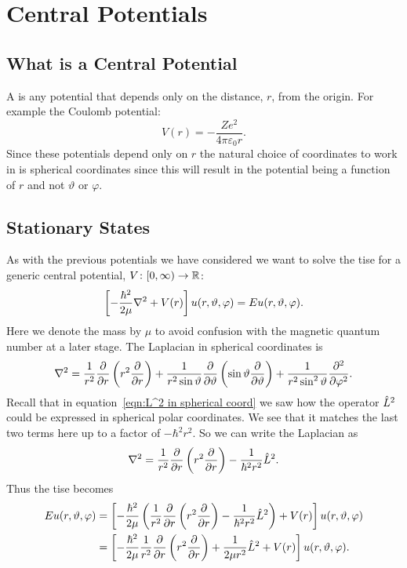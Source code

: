 \documentclass[a4paper]{article}
\theoremstyle{definition}
\begin{document}
    \section{Central Potentials}
    \subsection{What is a Central Potential}
    A  is any potential that depends only on the distance, \(r\), from the origin.
    For example the Coulomb potential:
    \[V(r) = -\frac{Ze^2}{4\pi\varepsilon_0 r}.\]
    Since these potentials depend only on \(r\) the natural choice of coordinates to work in is spherical coordinates since this will result in the potential being a function of \(r\) and not \(\vartheta\) or \(\varphi\).
    
    \subsection{Stationary States}\label{sec:stationary states central potentials}
    As with the previous potentials we have considered we want to solve the \gls{tise} for a generic central potential, \(V\colon[0, \infty)\to\mathbb{R}\):
    \[\left[-\frac{\hbar^2}{2\mu}\nabla^2 + V(r)\right]u(r, \vartheta, \varphi) = Eu(r, \vartheta, \varphi).\]
    Here we denote the mass by \(\mu\) to avoid confusion with the magnetic quantum number at a later stage.
    The Laplacian in spherical coordinates is
    \[\nabla^2 = \frac{1}{r^2}\pdv{r}\left(r^2\pdv{r}\right) + \frac{1}{r^2\sin\vartheta}\pdv{\vartheta}\left(\sin\vartheta\pdv{\vartheta}\right) + \frac{1}{r^2\sin^2\vartheta}\pdv[2]{\varphi}.\]
    Recall that in equation~\ref{eqn:L^2 in spherical coord} we saw how the operator \(\hat{L}^2\) could be expressed in spherical polar coordinates. 
    We see that it matches the last two terms here up to a factor of \(-\hbar^2r^2\).
    So we can write the Laplacian as
    \[\nabla^2 = \frac{1}{r^2}\pdv{r}\left(r^2\pdv{r}\right) - \frac{1}{\hbar^2 r^2}\hat{L}^2.\]
    Thus the \gls{tise} becomes
        \begin{align*}
            Eu(r, \vartheta, \varphi) &= \left[-\frac{\hbar^2}{2\mu} \left(\frac{1}{r^2}\pdv{r} \left(r^2\pdv{r}\right) - \frac{1}{\hbar^2r^2} \hat{L}^2\right) + V(r)\right]u(r, \vartheta, \varphi)\\
            &= \left[-\frac{\hbar^2}{2\mu}\frac{1}{r^2} \pdv{r}\left(r^2\pdv{r}\right) + \frac{1}{2\mu r^2}\hat{L}^2 + V(r)\right]u(r, \vartheta, \varphi).
    \end{align*}
\end{document}
